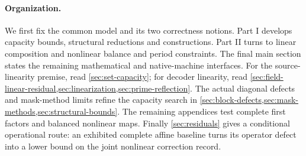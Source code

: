 \paragraph{Organization.}
We first fix the common model and its two correctness notions. Part I develops
capacity bounds, structural reductions and constructions. Part II turns to
linear composition and nonlinear balance and period constraints. The final
main section states the remaining mathematical and native-machine interfaces.
For the source-linearity premise, read \cref{sec:set-capacity}; for decoder
linearity, read \cref{sec:field-linear-residual,sec:linearization,sec:prime-reflection}.
The actual diagonal defects and mask-method limits refine the capacity search
in \cref{sec:block-defects,sec:mask-methods,sec:structural-bounds}.
The remaining appendices test complete first factors and balanced nonlinear
maps. Finally \cref{sec:residuals} gives a conditional operational route:
an exhibited complete affine baseline turns its operator defect into a
lower bound on the joint nonlinear correction record.
